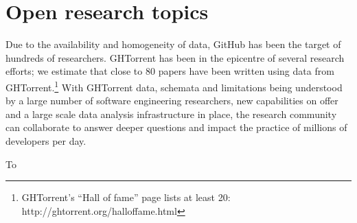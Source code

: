 \documentclass{sig-alternate}
\begin{document}
\section{Open research topics}

Due to the availability and homogeneity of data, GitHub has been the target of
hundreds of researchers. GHTorrent has been in the epicentre of several research
efforts; we estimate that close to 80 papers have been written using data from
GHTorrent.\footnote{GHTorrent's ``Hall of fame'' page lists at least 20:
http://ghtorrent.org/halloffame.html} With GHTorrent data, schemata and
limitations being understood by a large number of software engineering
researchers, new capabilities on offer and a large scale data analysis
infrastructure in place, the research community can collaborate to answer deeper
questions and impact the practice of millions of developers per day.

To 
\end{document}
